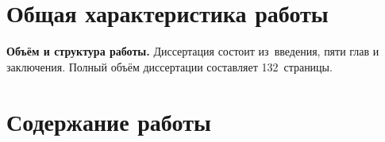 ﻿
\section*{Общая характеристика работы}

\providecommand{\tasksintro}{\pdfbookmark[1]{Задачи}{tasks}\underline{\textbf{Задачи исследования.}}\par Для~достижения поставленной цели необходимо было решить следующие \textbf{задачи}:}
\providecommand{\theory}{\pdfbookmark[1]{Теоретическая значимость}{theory}\underline{\textbf{Теоретическая значимость.}}}

\newcommand{\actuality}{\pdfbookmark[1]{Актуальность}{actuality}\underline{\textbf{Актуальность темы.}}\par}
\newcommand{\progress}{}
\newcommand{\aim}{\pdfbookmark[1]{Цель}{aim}\underline{\textbf{Цель работы.}}\par\textbf{Целью}}
\newcommand{\tasks}{\textbf{задачи}}
\newcommand{\novelty}{\pdfbookmark[1]{Научная новизна}{novelty}\underline{\textbf{Научная новизна.}}}
\newcommand{\influence}{\pdfbookmark[1]{Практическая значимость}{influence}\underline{\textbf{Практическая значимость}}}
\newcommand{\methods}{\pdfbookmark[1]{Методология и методы исследования}{methods}\underline{\textbf{Методология и методы исследования.}}}
\newcommand{\defpositions}{\pdfbookmark[1]{Основные положения, выносимые на защиту}{defpositions}\underline{\textbf{Основные положения, выносимые на защиту.}}}
\newcommand{\reliability}{\pdfbookmark[1]{Достоверность}{reliability}\underline{\textbf{Достоверность результатов.}}\par\mbox{Достоверность}}
\newcommand{\probation}{\pdfbookmark[1]{Апробация}{probation}\underline{\textbf{Апробация работы.}}}
\newcommand{\publications}{\pdfbookmark[1]{Публикации}{publications}\underline{\textbf{Публикации.}}}
\newcommand{\contribution}{\pdfbookmark[1]{Личный вклад}{contribution}\underline{\textbf{Личный вклад.}}}



\textbf{Объём и структура работы.} Диссертация состоит из~введения, пяти глав и заключения. Полный объём диссертации составляет 132~страницы.

\section*{Содержание работы}

